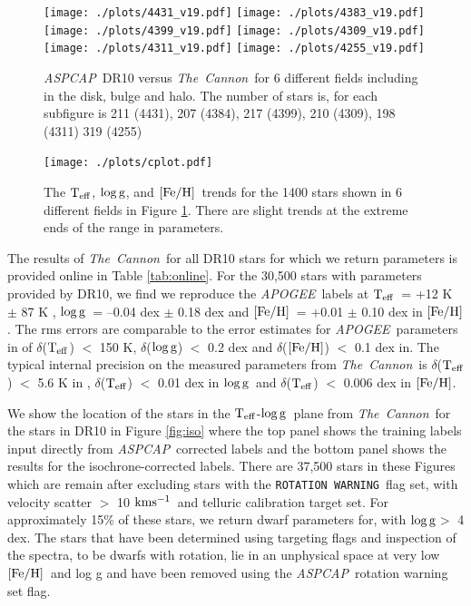 \documentclass[12pt, preprint]{aastex}
\newcommand{\teff}{\mbox{$\rm T_{eff}$}}
\newcommand{\kms}{\mbox{$\rm kms^{-1}$}}
\newcommand{\feh}{\mbox{$\rm [Fe/H]$}}
\newcommand{\logg}{\mbox{$\rm \log g$}}
\newcommand{\tc}{\textsl{The~Cannon}}
\newcommand{\apogee}{\textsl{APOGEE}}
\newcommand{\aspcap}{\textsl{ASPCAP}}
\newcommand{\rotwarn}{\texttt{ROTATION WARNING}}
\begin{document}
\begin{figure}[!h]
\centering
  \texttt{[image: ./plots/4431\_v19.pdf]}
    \texttt{[image: ./plots/4383\_v19.pdf]} \\
      \texttt{[image: ./plots/4399\_v19.pdf]}
        \texttt{[image: ./plots/4309\_v19.pdf]} \\
              \texttt{[image: ./plots/4311\_v19.pdf]}
        \texttt{[image: ./plots/4255\_v19.pdf]} 
\caption{\small{\aspcap\ DR10 versus \tc\ for 6 different fields including in the disk, bulge and halo. The number of stars is, for each subfigure is 211 (4431), 207 (4384), 217 (4399), 210 (4309), 198 (4311) 319 (4255) }}
\label{fig:cal}
\end{figure}

\begin{figure}[!h]
\centering
        \texttt{[image: ./plots/cplot.pdf]} 
\caption{The \teff, \logg, and \feh\ trends for the 1400 stars shown in 6 different fields in Figure \ref{fig:cal}. There are slight trends at the extreme ends of the range in parameters.}
\label{fig:cplot}
\end{figure}

The results of \tc\ for all DR10 stars for which we return parameters is provided online in Table \ref{tab:online}. For the 30,500 stars with parameters provided by DR10, we find we reproduce the \apogee\ labels at \teff\ = +12 K $\pm$ 87 K ,  \logg\ = --0.04 dex $\pm$  0.18 dex and \feh\ = +0.01 $\pm$ 0.10 dex in \feh. The rms errors are comparable to the error estimates for \apogee\ parameters in \citet{Meszaros2013} of $\delta$(\teff) $<$ 150 K, $\delta$(\logg) $<$  0.2 dex and $\delta$(\feh) $<$  0.1 dex in.  The typical internal precision on the measured parameters from \tc\ is  $\delta$(\teff) $<$ 5.6 K in ,  $\delta$(\teff) $<$ 0.01 dex in \logg\ and  $\delta$(\teff) $<$ 0.006 dex in \feh.

We show the location of the stars in the \teff-\logg\ plane from \tc\ for the stars in DR10 in Figure \ref{fig:iso} where the top panel shows the training labels input directly from \aspcap\ corrected labels and the bottom panel shows the results for the isochrone-corrected labels. There are 37,500 stars in these Figures which are remain after excluding stars with the \rotwarn\ flag set, with velocity scatter $>$ 10 \kms\ and telluric calibration target set. For approximately 15\% of these stars, we return dwarf parameters for, with \logg $>$ 4 dex.  The stars that have been determined using targeting flags and inspection of the spectra, to be dwarfs with rotation, lie in an unphysical space at very low \feh\ and log g and have been removed using the \aspcap\ rotation warning set flag.
\end{document}
